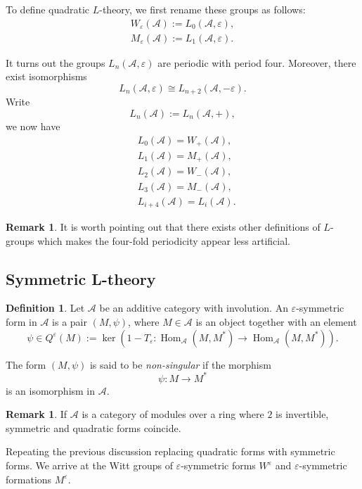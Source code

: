 \documentclass{article}
\theoremstyle{definition}
\newtheorem{defn}[theorem]{Definition}
\newtheorem{rmk}[theorem]{Remark}
\newcommand{\CA}{{ \mathcal A}}
\newcommand{\ZZ}{{\mathbb Z}}
\begin{document}
To define quadratic \( L \)-theory, we first rename these groups as follows:
\begin{align*}
    W_{\varepsilon}(\mathcal{A}) := L_0(\mathcal{A},\varepsilon), \\
M_{\varepsilon}(\mathcal{A}) := L_1(\mathcal{A}, \varepsilon).
\end{align*}

It turns out the groups $L_n(\CA, \varepsilon)$ are periodic with period four. Moreover, there exist isomorphisms $$L_n(\CA, \varepsilon)\cong L_{n+2}(\CA, -\varepsilon).$$ Write $$L_n(\CA):=L_n(\CA, +),$$ we now have 
\begin{align*}
    &L_0(\CA)= W_{+}(\CA),\\
    &L_1(\CA)= M_{+}(\CA),\\
    &L_2(\CA)= W_{-}(\CA),\\
    &L_3(\CA)= M_{-}(\CA),\\
    &L_{i+4}(\mathcal{A}) = L_i(\mathcal{A}).
\end{align*}
\begin{rmk}
It is worth pointing out that there exists other definitions of $L$-groups which makes the four-fold periodicity appear less artificial.
\end{rmk}

\subsection{Symmetric L-theory}
\begin{defn}
    
Let \( \mathcal{A} \) be an additive category with involution. An \( \varepsilon \)-symmetric form in \( \mathcal{A} \) is a pair \( (M, \psi) \), where \( M \in \mathcal{A} \) is an object together with an element
\[
\psi \in Q^\varepsilon(M) := \operatorname{ker}(1 - T_\varepsilon : \operatorname{Hom}_{\mathcal{A}}(M, M^*) \to \operatorname{Hom}_{\mathcal{A}}(M, M^*)).
\]

The form \( (M, \psi) \) is said to be \emph{non-singular} if the morphism
\[
 \psi : M \to M^*
\]
is an isomorphism in \( \mathcal{A} \).
\end{defn} 
\begin{rmk}
    If $\CA$ is a category of modules over a ring where $2$ is invertible, symmetric and quadratic forms coincide. 
\end{rmk}
Repeating the previous discussion replacing quadratic forms with symmetric forms. We arrive at the Witt groups of $\varepsilon$-symmetric forms $W^\varepsilon$ and $\varepsilon$-symmetric formations $M^\varepsilon.$ 
\end{document}
